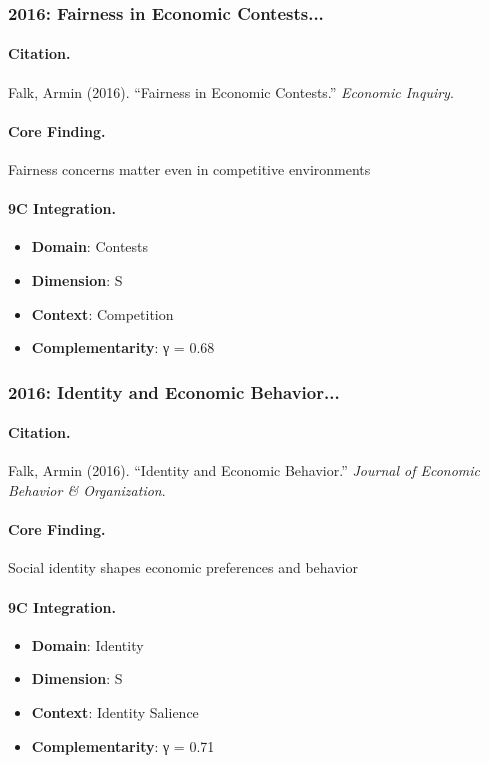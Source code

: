 \subsubsection{2016: Fairness in Economic Contests...}

\paragraph{Citation.}
Falk, Armin (2016). ``Fairness in Economic Contests.''
\textit{Economic Inquiry}.

\paragraph{Core Finding.}
Fairness concerns matter even in competitive environments

\paragraph{9C Integration.}
\begin{itemize}[nosep]
  \item \textbf{Domain}: Contests
  \item \textbf{Dimension}: S
  \item \textbf{Context}: Competition
  \item \textbf{Complementarity}: γ = 0.68
\end{itemize}


\subsubsection{2016: Identity and Economic Behavior...}

\paragraph{Citation.}
Falk, Armin (2016). ``Identity and Economic Behavior.''
\textit{Journal of Economic Behavior & Organization}.

\paragraph{Core Finding.}
Social identity shapes economic preferences and behavior

\paragraph{9C Integration.}
\begin{itemize}[nosep]
  \item \textbf{Domain}: Identity
  \item \textbf{Dimension}: S
  \item \textbf{Context}: Identity Salience
  \item \textbf{Complementarity}: γ = 0.71
\end{itemize}


